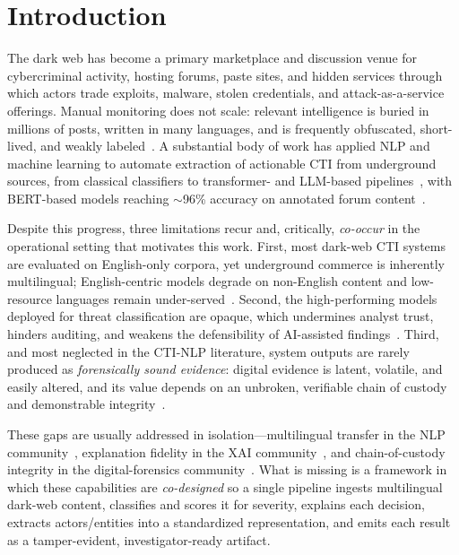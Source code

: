 \documentclass[11pt,a4paper]{article}
\begin{document}
\section{Introduction}\label{sec:intro}

The dark web has become a primary marketplace and discussion venue for cybercriminal
activity, hosting forums, paste sites, and hidden services through which actors trade
exploits, malware, stolen credentials, and attack-as-a-service offerings. Manual
monitoring does not scale: relevant intelligence is buried in millions of posts, written
in many languages, and is frequently obfuscated, short-lived, and weakly
labeled~\cite{schroer2025darkside,kadoguchi2019exploring}. A substantial body of work has
applied NLP and machine learning to automate extraction of actionable CTI from
underground sources, from classical classifiers to transformer- and LLM-based
pipelines~\cite{sangher2023towards,sangher2024lstm,shah2025madcti,demarcos2026llm,pasupuleti2025threat},
with BERT-based models reaching $\sim$96\% accuracy on annotated forum
content~\cite{sangher2023towards}.

Despite this progress, three limitations recur and, critically, \emph{co-occur} in the
operational setting that motivates this work. First, most dark-web CTI systems are
evaluated on English-only corpora, yet underground commerce is inherently multilingual;
English-centric models degrade on non-English content and low-resource languages remain
under-served~\cite{pakray2025nlp,alharbi2025bert,nazir2025multilingual}. Second, the
high-performing models deployed for threat classification are opaque, which undermines
analyst trust, hinders auditing, and weakens the defensibility of AI-assisted
findings~\cite{gaspar2024xai,hermosilla2025xai,sunkara2025xai}. Third, and most neglected
in the CTI-NLP literature, system outputs are rarely produced as \emph{forensically sound
evidence}: digital evidence is latent, volatile, and easily altered, and its value
depends on an unbroken, verifiable chain of custody and demonstrable
integrity~\cite{lone2019forensicchain,loffi2025management,patil2024potential}.

These gaps are usually addressed in isolation---multilingual transfer in the NLP
community~\cite{thangaraj2024crosslingual,conneau2020xlmr}, explanation fidelity in the
XAI community~\cite{gaspar2024xai,salih2023perspective,kalakoti2025evaluating}, and
chain-of-custody integrity in the digital-forensics
community~\cite{lone2019forensicchain,ali2022procedure,pontecuevas2025blockchain}. What is
missing is a framework in which these capabilities are \emph{co-designed} so a single
pipeline ingests multilingual dark-web content, classifies and scores it for severity,
explains each decision, extracts actors/entities into a standardized representation, and
emits each result as a tamper-evident, investigator-ready artifact.
\end{document}
